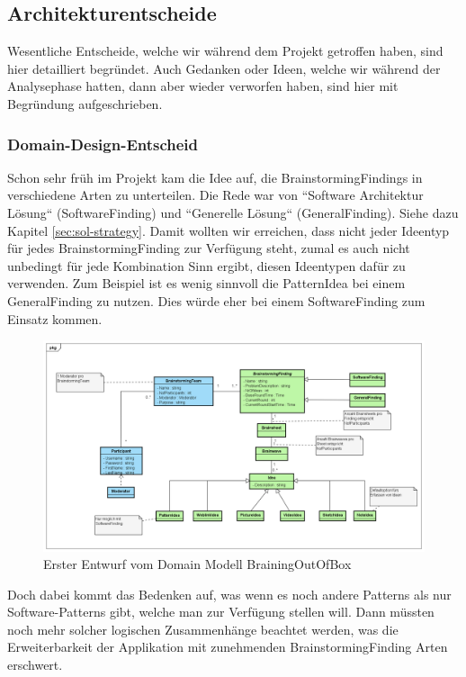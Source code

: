 \subsection{Architekturentscheide}
Wesentliche Entscheide, welche wir während dem Projekt getroffen haben, sind hier detailliert begründet. Auch Gedanken oder Ideen, welche wir während der Analysephase hatten, dann aber wieder verworfen haben, sind hier mit Begründung aufgeschrieben.

\subsubsection{Domain-Design-Entscheid}
Schon sehr früh im Projekt kam die Idee auf, die BrainstormingFindings in verschiedene Arten zu unterteilen. Die Rede war von ``Software Architektur Lösung`` (SoftwareFinding) und ``Generelle Lösung`` (GeneralFinding). Siehe dazu Kapitel \ref{sec:sol-strategy}. Damit wollten wir erreichen, dass nicht jeder Ideentyp für jedes BrainstormingFinding zur Verfügung steht, zumal es auch nicht unbedingt für jede Kombination Sinn ergibt, diesen Ideentypen dafür zu verwenden. Zum Beispiel ist es wenig sinnvoll die PatternIdea bei einem GeneralFinding zu nutzen. Dies würde eher bei einem SoftwareFinding zum Einsatz kommen.

\begin{figure}[h]
	\centering
	\includegraphics[width=1\linewidth]{img/domain-analyse/DomainModell-Methode635-Entwurf}
	\caption{Erster Entwurf vom Domain Modell BrainingOutOfBox}
	\label{fig:domainmodell-methode635-entwurf}
\end{figure}

Doch dabei kommt das Bedenken auf, was wenn es noch andere Patterns als nur Software-Patterns gibt, welche man zur Verfügung stellen will. Dann müssten noch mehr solcher logischen Zusammenhänge beachtet werden, was die Erweiterbarkeit der Applikation mit zunehmenden BrainstormingFinding Arten erschwert.


